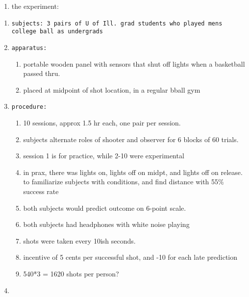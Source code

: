 \documentclass[12pt,twoside]{dukestatscithesis}
\providecommand{\tightlist}{%
  \setlength{\itemsep}{0pt}\setlength{\parskip}{0pt}}
\theoremstyle{definition}
\theoremstyle{definition}
\theoremstyle{definition}
\theoremstyle{remark}
\begin{document}
\begin{enumerate}
\def\labelenumi{\Alph{enumi}.}
\setcounter{enumi}{2}
\tightlist
\item
  the experiment:
\end{enumerate}
\begin{enumerate}
\def\labelenumi{\arabic{enumi}.}
\item
\begin{verbatim}
subjects: 3 pairs of U of Ill. grad students who played mens college ball as undergrads
\end{verbatim}
\item
\begin{verbatim}
apparatus:
\end{verbatim}
  \begin{enumerate}
  \def\labelenumii{\alph{enumii}.}
  \tightlist
  \item
    portable wooden panel with sensors that shut off lights when a
    basketball passed thru.
  \item
    placed at midpoint of shot location, in a regular bball gym
  \end{enumerate}
\item
\begin{verbatim}
procedure:
\end{verbatim}
  \begin{enumerate}
  \def\labelenumii{\alph{enumii}.}
  \tightlist
  \item
    10 sessions, approx 1.5 hr each, one pair per session.
  \item
    subjects alternate roles of shooter and observer for 6 blocks of 60
    trials.
  \item
    session 1 is for practice, while 2-10 were experimental
  \item
    in prax, there was lights on, lights off on midpt, and lights off on
    release. to familiarize subjects with conditions, and find distance
    with 55\% success rate
  \item
    both subjects would predict outcome on 6-point scale.
  \item
    both subjects had headphones with white noise playing
  \item
    shots were taken every 10ish seconds.
  \item
    incentive of 5 cents per successful shot, and -10 for each late
    prediction
  \item
    540*3 = 1620 shots per person?
  \end{enumerate}
\item

\end{enumerate}
\end{document}
